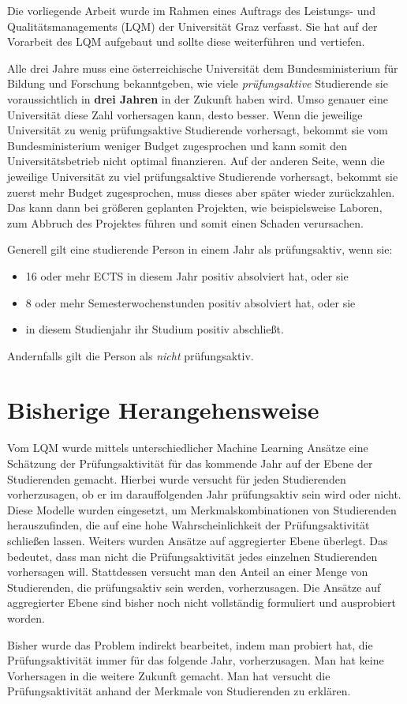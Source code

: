 

Die vorliegende Arbeit wurde im Rahmen eines Auftrags des Leistungs- und Qualit\"atsmanagements (LQM) der
Universität Graz verfasst. Sie hat auf der Vorarbeit des LQM aufgebaut und sollte diese weiterf\"uhren
und vertiefen.

Alle drei Jahre muss eine \"osterreichische Universität dem Bundesministerium f\"ur Bildung und Forschung
bekanntgeben, wie viele \textit{pr\"ufungsaktive} Studierende sie voraussichtlich in \textbf{drei Jahren}
in der Zukunft haben wird. Umso genauer eine Universität diese Zahl vorhersagen kann, desto besser.
Wenn die jeweilige Universität zu wenig pr\"ufungsaktive Studierende vorhersagt, bekommt sie vom Bundesministerium
weniger Budget zugesprochen und kann somit den Universitätsbetrieb nicht optimal finanzieren. Auf der anderen Seite,
wenn die jeweilige Universität zu viel pr\"ufungsaktive Studierende vorhersagt, bekommt sie zuerst mehr Budget zugesprochen,
muss dieses aber sp\"ater wieder zur\"uckzahlen. Das kann dann bei gr\"o{\ss}eren geplanten Projekten, wie beispielsweise Laboren,
zum Abbruch des Projektes f\"uhren und somit einen Schaden verursachen.

\noindent Generell gilt eine studierende Person in einem Jahr als pr\"ufungsaktiv, wenn sie:

\begin{itemize}
    \item 16 oder mehr ECTS in diesem Jahr positiv absolviert hat, oder sie
    \item 8 oder mehr Semesterwochenstunden positiv absolviert hat, oder sie
    \item in diesem Studienjahr ihr Studium positiv abschlie{\ss}t.
\end{itemize}
Andernfalls gilt die Person als \textit{nicht} pr\"ufungsaktiv.


\section{Bisherige Herangehensweise}

Vom LQM wurde mittels unterschiedlicher Machine Learning Ans\"atze eine Sch\"atzung der Pr\"ufungsaktivit\"at
f\"ur das kommende Jahr auf der Ebene der Studierenden gemacht. 
Hierbei wurde versucht f\"ur jeden Studierenden vorherzusagen, ob er im darauffolgenden Jahr pr\"ufungsaktiv sein wird oder nicht.
Diese Modelle wurden eingesetzt, um Merkmalskombinationen von Studierenden herauszufinden,
die auf eine hohe Wahrscheinlichkeit der Pr\"ufungsaktivit\"at schlie{\ss}en lassen.
Weiters wurden Ans\"atze auf aggregierter Ebene \"uberlegt. Das bedeutet, dass man nicht die Pr\"ufungsaktivit\"at jedes
einzelnen Studierenden vorhersagen will. Stattdessen
versucht man den Anteil an einer Menge von Studierenden, die pr\"ufungsaktiv sein werden, vorherzusagen.
Die Ans\"atze auf aggregierter Ebene sind bisher noch nicht vollst\"andig formuliert und ausprobiert worden.


Bisher wurde das Problem indirekt bearbeitet, indem man probiert hat, die Pr\"ufungsaktivit\"at
immer f\"ur das folgende Jahr, vorherzusagen. Man hat keine Vorhersagen in die weitere Zukunft gemacht.
Man hat versucht die Pr\"ufungsaktivit\"at anhand der Merkmale von Studierenden zu erkl\"aren.

